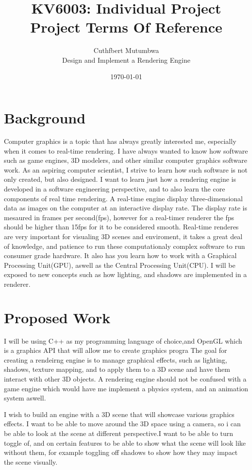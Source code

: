 \title{KV6003: Individual Project\\ Project Terms Of Reference}
\author{Cuthfbert Mutumbwa\\ Design and Implement a Rendering Engine}
\date{\today}

\maketitle

\section{Background}
Computer graphics is a topic that has always greatly interested me, especially when it comes to real-time rendering.
I have always wanted to know how software such as game engines, 3D modelers, and other similar computer graphics software work.
As an aspiring computer scientist, I strive to learn how such software is not only created, but also designed. 
I want to learn just how a rendering engine is developed in a software engineering perspective, and to also learn the core components
of real time rendering.
A real-time engine display three-dimensional data as images on the computer at an interactive display rate. The display rate is mesaured in frames per second(fps), however for a real-timer renderer the fps should be higher than 15fps for it to be considered smooth.
Real-time renderes are very important for visualing 3D scenes and enviroment, it takes a great deal of knowledge, and patience to run these computationaly complex software to run consumer grade hardware. It also has you learn how to work with a Graphical Processing Unit(GPU), aswell as the Central Processing Unit(CPU).
I will be exposed to new concepts such as how lighting, and shadows are implemented in a renderer.
\section{Proposed Work}
I will be using C++ as my programming language of choice,and OpenGL which is a graphics API that will allow me to create graphics progra
The goal for creating a rendeirng engine is to manage graphical effects, such as lighting, shadows, texture mapping, and to apply them to a 3D scene and have them interact with other 3D objects. A rendering engine should not be confused with a game engine which would have me implement a physics system, and an animation system aswell.

I wish to build an engine with a 3D scene that will showcase various graphics effects. I want to be able to move around the 3D space using a camera, so i can be able to look at the scene at different perspective.I want to be able to turn toggle of, and on certain features to be able to show what the scene will look like without them, for example toggling off shadows to show how they may impact the scene visually.


